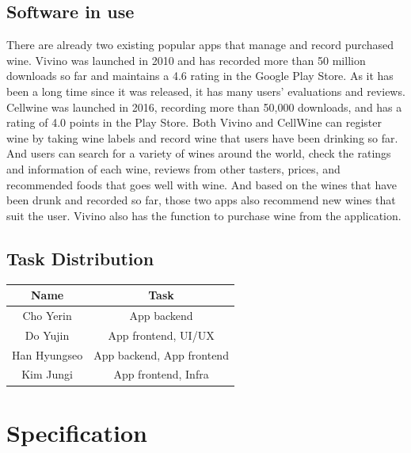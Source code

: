 \documentclass[conference]{IEEEtran}
\numberwithin{figure}{subsection}
\begin{document}
\subsection{Software in use}
There are already two existing popular apps that manage and record purchased wine. Vivino was launched in 2010 and has recorded more than 50 million downloads so far and maintains a 4.6 rating in the Google Play Store. As it has been a long time since it was released, it has many users' evaluations and reviews. Cellwine was launched in 2016, recording more than 50,000 downloads, and has a rating of 4.0 points in the Play Store. Both Vivino and CellWine can register wine by taking wine labels and record wine that users have been drinking so far. And users can search for a variety of wines around the world, check the ratings and information of each wine, reviews from other tasters, prices, and recommended foods that goes well with wine. And based on the wines that have been drunk and recorded so far, those two apps also recommend new wines that suit the user. Vivino also has the function to purchase wine from the application.

\subsection{Task Distribution}
\begin{table}[h!]
    \begin{center}
        \begin{tabular}{|c|c|}
        \hline
        Name & Task\\
        \hline
         Cho Yerin & App backend\\
         \hline
        Do Yujin & App frontend, UI/UX\\
        \hline
        Han Hyungseo & App backend, App frontend\\
        \hline
        Kim Jungi & App frontend, Infra\\
        \hline
        \end{tabular}
    \end{center}
\end{table}

\section{Specification}
\end{document}
